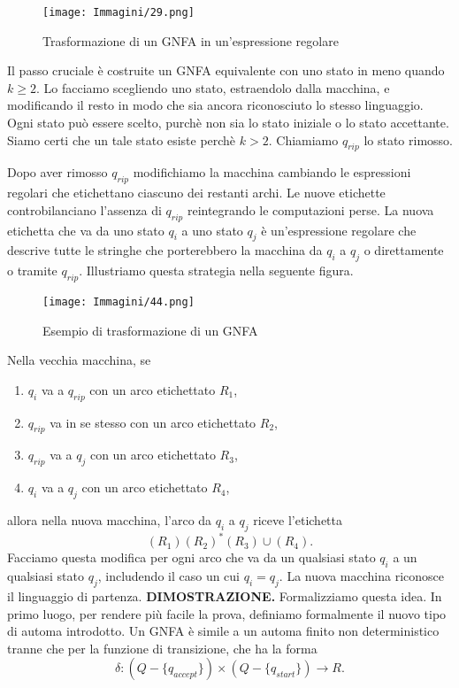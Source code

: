 \documentclass{article}
\begin{document}
\begin{figure}[H]
    \centering
    \texttt{[image: Immagini/29.png]}
    \caption{Trasformazione di un GNFA in un'espressione regolare}
    \label{fig:your_image}
\end{figure}

Il passo cruciale è costruite un GNFA equivalente con uno stato in meno quando $k \geq 2$.
Lo facciamo scegliendo uno stato, estraendolo dalla macchina, e modificando il resto in modo che sia ancora riconosciuto lo stesso linguaggio.
Ogni stato può essere scelto, purchè non sia lo stato iniziale o lo stato accettante. Siamo certi che un tale stato esiste perchè $k > 2$.
Chiamiamo $q_{rip}$ lo stato rimosso.

Dopo aver rimosso $q_{rip}$ modifichiamo la macchina cambiando le espressioni regolari che etichettano ciascuno dei restanti archi.
Le nuove etichette controbilanciano l'assenza di $q_{rip}$ reintegrando le computazioni perse.
La nuova etichetta che va da uno stato $q_i$ a uno stato $q_j$ è un'espressione regolare che descrive tutte le stringhe che porterebbero la macchina da $q_i$ a $q_j$ o direttamente o tramite $q_{rip}$.
Illustriamo questa strategia nella seguente figura.

\begin{figure}[H]
    \centering
    \texttt{[image: Immagini/44.png]}
    \caption{Esempio di trasformazione di un GNFA}
    \label{fig:gnfa_example}
\end{figure}

Nella vecchia macchina, se

\begin{enumerate}
    \item $q_{i}$ va a $q_{rip}$ con un arco etichettato $R_1$,
    \item $q_{rip}$ va in se stesso con un arco etichettato $R_2$,
    \item $q_{rip}$ va a $q_j$ con un arco etichettato $R_3$,
    \item $q_i$ va a $q_j$ con un arco etichettato $R_4$,
\end{enumerate}
allora nella nuova macchina, l'arco da $q_i$ a $q_j$ riceve l'etichetta
$$(R_1)(R_2)^* (R_3)\cup (R_4).$$
Facciamo questa modifica per ogni arco che va da un qualsiasi stato $q_i$ a un qualsiasi stato $q_j$, includendo il caso un cui $q_i = q_j$.
La nuova macchina riconosce il linguaggio di partenza.
\vspace{1em}
\text{}
\newline
\textbf{DIMOSTRAZIONE.}
Formalizziamo questa idea.
In primo luogo, per rendere più facile la prova, definiamo formalmente il nuovo tipo di automa introdotto.
Un GNFA è simile a un automa finito non deterministico tranne che per la funzione di transizione, che ha la forma
$$ \delta : (Q - \{q_{accept} \}) \times (Q- \{q_{start} \}) \rightarrow R.$$
\end{document}
